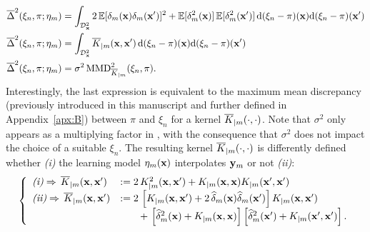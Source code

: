 \begin{subequations}
    \begin{align}
        \overline{\Delta}^2(\xi_n,\pi;\eta_m)&= \int_{\mathcal{D}_{\bf x}^2} 2 \, \mathbb{E}[\delta_m({\bf x})\delta_m({\bf x}')]^2 + \mathbb{E}[\delta_m^2({\bf x})] \, \mathbb{E}[\delta_m^2({\bf x}')] \,\mathrm{d}(\xi_n-\pi)({\bf x})\mathrm{d}(\xi_n-\pi)({\bf x}') \\
        \overline{\Delta}^2(\xi_n,\pi;\eta_m)&= \int_{\mathcal{D}_{\bf x}^2} \overline{K}_{|m}({\bf x}, {\bf x}')\,\mathrm{d}(\xi_n-\pi)({\bf x})\mathrm{d}(\xi_n-\pi)({\bf x}') \label{eq:c5_variance} \\
        \overline{\Delta}^2(\xi_n,\pi;\eta_m)&= \sigma^2\, \mathrm{MMD}_{\overline{K}_{|m}}^2(\xi_n,\pi).
    \end{align}
\end{subequations}
Interestingly, the last expression is equivalent to the maximum mean discrepancy (previously introduced in this manuscript and further defined in Appendix~\ref{apx:B}) between $\pi$ and $\xi_n$ for a kernel $\overline{K}_{|m}(\cdot, \cdot)$. 
Note that $\sigma^2$ only appears as a multiplying factor in , with the consequence that $\sigma^2$ does not impact the choice of a suitable $\xi_n$.
The resulting kernel $\overline{K}_{|m}(\cdot, \cdot)$ is differently defined whether \textit{(i)} the learning model $\eta_m({\bf x})$ interpolates ${\bf y}_m$ or not \textit{(ii)}: 
\begin{align}
    \left\{
    \begin{array}{ll}
        \textit{(i)}  \Rightarrow  \, \overline{K}_{|m}({\bf x},{\bf x}')&:= 2\, K_{|m}^2({\bf x},{\bf x}') + K_{|m}({\bf x},{\bf x}) K_{|m}({\bf x}',{\bf x}')\\
        \textit{(ii)} \Rightarrow  \, \overline{K}_{|m}({\bf x},{\bf x}')&:= 2\, \left[K_{|m}({\bf x},{\bf x}') + 2\,\widehat\delta_m({\bf x})\widehat\delta_m({\bf x}')\right]K_{|m}({\bf x},{\bf x}') \\
                                                        & \qquad +\,\left[\widehat\delta_m^2({\bf x})+K_{|m}({\bf x},{\bf x})\right]\left[\widehat\delta_m^2({\bf x}')+K_{|m}({\bf x}',{\bf x}')\right]. 
        \label{Eq:Kbarbar}
    \end{array}
\right.
\end{align}


